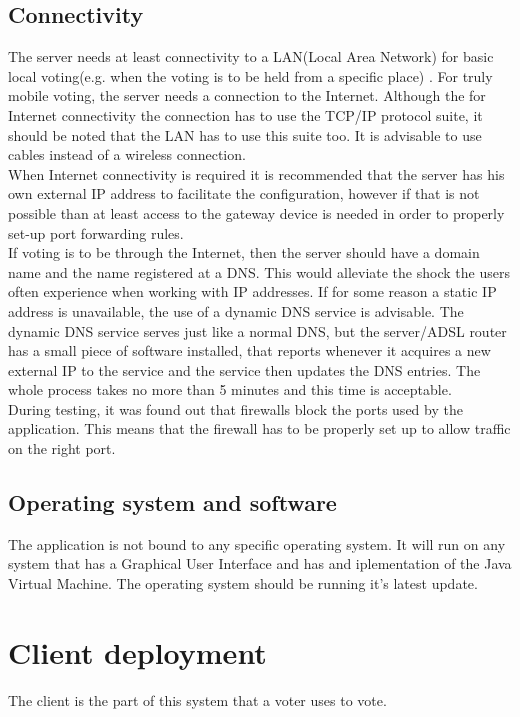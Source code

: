 \documentclass[11pt,twoside,a4paper]{book}
\begin{document}
\subsection{Connectivity}
The server needs at least connectivity to a LAN(Local Area Network) for basic local voting(e.g. when the voting is to be held from a specific place) . For truly mobile voting, the server needs a connection to the Internet. Although the for Internet connectivity the connection has to use the TCP/IP protocol  suite, it should be noted that the LAN has to use this suite too. It is advisable to use cables instead of a wireless connection. \\
When Internet connectivity is required it is recommended that the server has his own external IP address to facilitate the configuration, however if that is not possible than at least access to the gateway device is needed in order to properly set-up port forwarding rules.
\\
If voting is to be through the Internet, then the server should have a domain name and the name registered at a DNS. This would alleviate the shock the users often experience when working with IP addresses. If for some reason a static IP address is unavailable, the use of a dynamic DNS service is advisable. The dynamic DNS service serves just like a normal DNS, but the server/ADSL router has a small piece of software installed, that reports whenever it acquires a new external IP to the service and the service then updates the DNS entries. The whole process takes no more than 5 minutes and this time is acceptable.
\\
During testing, it was found out that firewalls block the ports used by the application. This means that the firewall has to be properly set up to allow traffic on the right port.
\\
\subsection{Operating system and software}
The application is not bound to any specific operating system. It will run on any system that has a Graphical User Interface and has and iplementation of the Java Virtual Machine. The operating system should be running it's latest update.

\section{Client deployment}
The client is the part of this system that a voter uses to vote.
\end{document}
